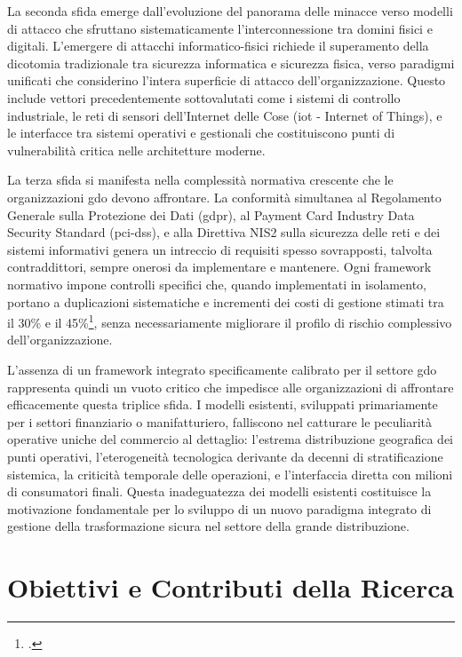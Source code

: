 La seconda sfida emerge dall'evoluzione del panorama delle minacce verso modelli di attacco che sfruttano sistematicamente l'interconnessione tra domini fisici e digitali. L'emergere di attacchi informatico-fisici richiede il superamento della dicotomia tradizionale tra sicurezza informatica e sicurezza fisica, verso paradigmi unificati che considerino l'intera superficie di attacco dell'organizzazione. Questo include vettori precedentemente sottovalutati come i sistemi di controllo industriale, le reti di sensori dell'Internet delle Cose (\gls{iot} - Internet of Things), e le interfacce tra sistemi operativi e gestionali che costituiscono punti di vulnerabilità critica nelle architetture moderne.

La terza sfida si manifesta nella complessità normativa crescente che le organizzazioni \gls{gdo} devono affrontare. La conformità simultanea al Regolamento Generale sulla Protezione dei Dati (\gls{gdpr}), al Payment Card Industry Data Security Standard (\gls{pci-dss}), e alla Direttiva NIS2 sulla sicurezza delle reti e dei sistemi informativi genera un intreccio di requisiti spesso sovrapposti, talvolta contraddittori, sempre onerosi da implementare e mantenere. Ogni framework normativo impone controlli specifici che, quando implementati in isolamento, portano a duplicazioni sistematiche e incrementi dei costi di gestione stimati tra il 30\% e il 45\%\footcite{kpmg2024compliance}, senza necessariamente migliorare il profilo di rischio complessivo dell'organizzazione.

L'assenza di un framework integrato specificamente calibrato per il settore \gls{gdo} rappresenta quindi un vuoto critico che impedisce alle organizzazioni di affrontare efficacemente questa triplice sfida. I modelli esistenti, sviluppati primariamente per i settori finanziario o manifatturiero, falliscono nel catturare le peculiarità operative uniche del commercio al dettaglio: l'estrema distribuzione geografica dei punti operativi, l'eterogeneità tecnologica derivante da decenni di stratificazione sistemica, la criticità temporale delle operazioni, e l'interfaccia diretta con milioni di consumatori finali. Questa inadeguatezza dei modelli esistenti costituisce la motivazione fondamentale per lo sviluppo di un nuovo paradigma integrato di gestione della trasformazione sicura nel settore della grande distribuzione.

\section{\texorpdfstring{Obiettivi e Contributi della Ricerca}{1.3 - Obiettivi e Contributi della Ricerca}}
\label{sec:obiettivi_contributi}

